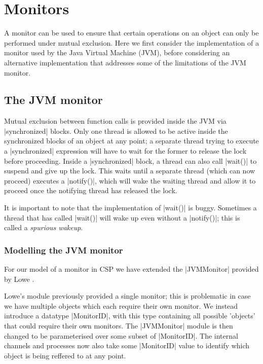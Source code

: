 \inlineScala
\section{Monitors}

A monitor can be used to ensure that certain operations on an object can only be performed under mutual exclusion. Here we first consider the implementation of a monitor used by the Java Virtual Machine (JVM), before considering an alternative implementation that addresses some of the limitations of the JVM monitor.

\subsection{The JVM monitor}

Mutual exclusion between function calls is provided inside the JVM via |synchronized| blocks. Only one thread is allowed to be active inside the synchronized blocks of an object at any point; a separate thread trying to execute a |synchronized| expression will have to wait for the former to release the lock before proceeding. Inside a |synchronized| block, a thread can also call |wait()| to suspend and give up the lock. This waits until a separate thread (which can now proceed) executes a |notify()|, which will wake the waiting thread and allow it to proceed once the notifying thread has released the lock.

It is important to note that the implementation of |wait()| is buggy. Sometimes a thread that has called |wait()| will wake up even without a |notify()|; this is called a \emph{spurious wakeup}.




\subsubsection{Modelling the JVM monitor}

\inlineCSP

For our model of a monitor in CSP we have extended the |JVMMonitor| provided by Lowe \cite{LoweJVMMonitor}.

Lowe's module previously provided a single monitor; this is problematic in case we have multiple objects which each require their own monitor. We instead introduce a datatype |MonitorID|, with this type containing all possible 'objects' that could require their own monitors. The |JVMMonitor| module is then changed to be parameterised over some subset of |MonitorID|. The internal channels and processes now also take some |MonitorID| value to identify which object is being reffered to at any point.

